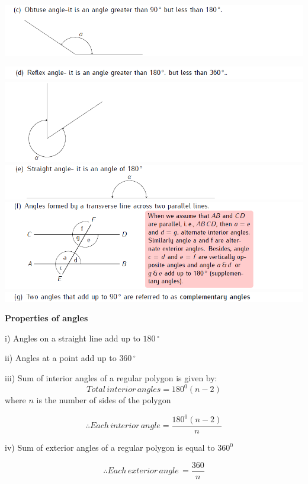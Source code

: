\documentclass[
  a4paperpaper,
]{scrbook}
\begin{document}
\includegraphics{images/Cpt15_anglesc.png}

\includegraphics{images/Cpt15_anglesd.png}
\includegraphics{images/Cpt15_anglesd2.png}
\includegraphics{images/Cpt15_anglese.png}
\includegraphics{images/Cpt15_anglesf.png}
\includegraphics{images/Cpt15_anglesg.png}

\textbf{Properties of angles}

i) Angles on a straight line add up to \(180\,^{\circ}\)

ii) Angles at a point add up to \(360\,^{\circ}\)

iii) Sum of interior angles of a regular polygon is given by:
\[Total \, interior \, angles
   =180^0(n-2)\] where \(n\) is the number of sides of the polygon

\[\therefore Each \,interior\, angle=\frac{180^0(n-2)}{n}\]

iv) Sum of exterior angles of a regular polygon is equal to \(360^0\)

\[\therefore Each\, exterior\, angle\,=\frac{360}{n}\]
\end{document}
